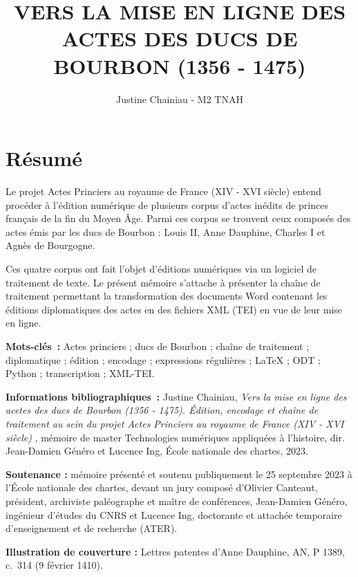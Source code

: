 \documentclass[a4paper,12pt,twoside]{book}
\author{Justine Chainiau - M2 TNAH}
\title{VERS LA MISE EN LIGNE DES ACTES DES DUCS DE BOURBON (1356 - 1475)}
\begin{document}
 
	
	\thispagestyle{empty}	
	\cleardoublepage
	
	\frontmatter
	\chapter{Résumé}
	\medskip
	Le projet \og Actes Princiers au royaume de France (\textsc{XIV} - \textsc{XVI} siècle) \fg \space entend procéder à l’édition numérique de plusieurs corpus d’actes inédits de princes français de la fin du Moyen Âge. Parmi ces corpus se trouvent ceux composés des actes émis par les ducs de Bourbon : Louis II, Anne Dauphine, Charles I et Agnès de Bourgogne. 
 \newline 
    \par Ces quatre corpus ont fait l'objet d'éditions numériques via un logiciel de traitement de texte. Le présent mémoire s'attache à présenter la chaîne de traitement permettant la transformation des documents Word contenant les éditions diplomatiques des actes en des fichiers XML (TEI) en vue de leur mise en ligne. 
	\bigskip
    \bigskip
    \bigskip
    
	\textbf{Mots-clés~:} Actes princiers ; ducs de Bourbon ; chaîne de traitement ; diplomatique ; édition ; encodage ; expressions régulières ; LaTeX ; ODT ; Python ; transcription ; XML-TEI.
 \newline 
	
	\textbf{Informations bibliographiques~:} Justine Chainiau, \textit{Vers la mise en ligne des acetes des ducs de Bourbon (1356 - 1475). Édition, encodage et chaîne de traitement au sein du projet \og Actes Princiers au royaume de France (\textsc{XIV} - \textsc{XVI} siècle) \fg}, mémoire de master \og{}Technologies numériques appliquées à l'histoire\fg{}, dir. Jean-Damien Généro et Lucence Ing, École nationale des chartes, 2023.
\newline 

    \textbf{Soutenance :} mémoire présenté et soutenu publiquement le 25 septembre 2023 à l’École nationale des chartes, devant un jury composé d’Olivier Canteaut, président, archiviste paléographe et maître de conférences, Jean-Damien Généro, ingénieur d'études du CNRS et Lucence Ing, doctorante et attachée temporaire d'enseignement et de recherche (ATER).  
    \newline 

    \textbf{Illustration de couverture :} Lettres patentes d'Anne Dauphine, AN, P 1389, c.~314 (9 février 1410). 
	
\end{document}
